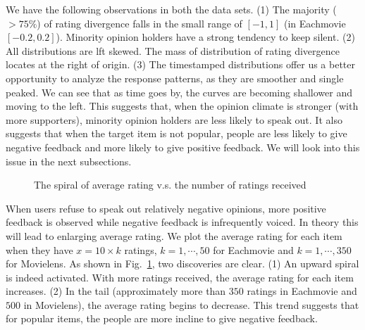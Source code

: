 \documentclass{sig-alternate}
\begin{document}
We have the following observations in both the data sets. (1) The majority ($>75\%$) of rating divergence falls in the small range of $[-1,1]$ (in Eachmovie $[-0.2,0.2]$). Minority opinion holders have a strong tendency to keep silent. (2) All distributions are lft skewed. The mass of distribution of rating divergence locates at the right of origin. (3) The timestamped distributions offer us a better opportunity to analyze the response patterns, as they are smoother and single peaked. We can see that as time goes by, the curves are becoming shallower and moving to the left. This suggests that, when the opinion climate is stronger (with more supporters), minority opinion holders are less likely to speak out. It also suggests that when the target item is not popular, people are less likely to give negative feedback and more likely to give positive feedback. We will look into this issue in the next subsections.

\begin{figure}[htbp]
\centering
\centering
{}
\caption{The spiral of average rating v.s. the number of ratings received}\label{fig:spiral}
\end{figure}

When users refuse to speak out relatively negative opinions, more positive feedback is observed while negative feedback is infrequently voiced. In theory this will lead to enlarging average rating. We plot the average rating for each item when they have $x=10\times k$ ratings, $k=1,\cdots,50$ for Eachmovie and $k=1,\cdots,350$ for Movielens. As shown in Fig.~\ref{fig:spiral}, two discoveries are clear. (1) An upward spiral is indeed activated. With more ratings received, the average rating for each item  increases. (2) In the tail (approximately more than $350$ ratings in Eachmovie and $500$ in Movielens), the average rating begins to decrease. This trend suggests that for popular items, the people are more incline to give negative feedback.
\end{document}
